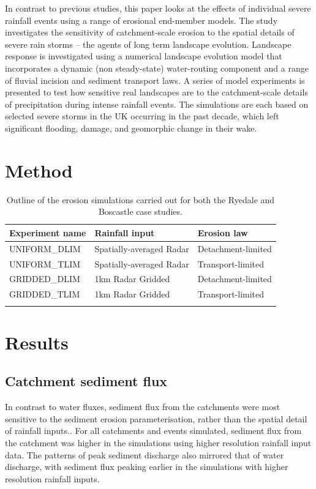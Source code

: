 In contrast to previous studies, this paper looks at the effects of individual severe rainfall events using a range of erosional end-member models. The study investigates the sensitivity of catchment-scale erosion to the spatial details of severe rain storms -- the agents of long term landscape evolution. Landscape response is investigated using a numerical landscape evolution model that incorporates a dynamic (non steady-state) water-routing component and a range of fluvial incision and sediment transport laws. A series of model experiments is presented to test how sensitive real landscapes are to the catchment-scale details of precipitation during intense rainfall events. The simulations are each based on selected severe storms in the UK occurring in the past decade, which left significant flooding, damage, and geomorphic change in their wake.

\section{Method}

\begin{table}
\begin{tabular}{lll}
\\
\textbf{Experiment name}   & \textbf{Rainfall input} & \textbf{Erosion law}  \\
\hline
UNIFORM\_DLIM      &  Spatially-averaged Radar   & Detachment-limited \\
UNIFORM\_TLIM       &  Spatially-averaged Radar  & Transport-limited \\

GRIDDED\_DLIM      &  1km Radar Gridded  & Detachment-limited \\
GRIDDED\_TLIM       &  1km Radar Gridded  & Transport-limited \\
\hline \\ 
\end{tabular} 
\caption{Outline of the erosion simulations carried out for both the Ryedale and Boscastle case studies.}
\label{table_ensemble_experiments}
\end{table}

\section{Results}
\subsection{Catchment sediment flux}
In contrast to water fluxes, sediment flux from the catchments were most sensitive to the sediment erosion parameterisation, rather than the spatial detail of rainfall inputs.. For all catchments and events simulated, sediment flux from the catchment was higher in the simulations using higher resolution rainfall input data. The patterns of peak sediment discharge also mirrored that of water discharge, with sediment flux peaking earlier in the simulations with higher resolution rainfall inputs. 

